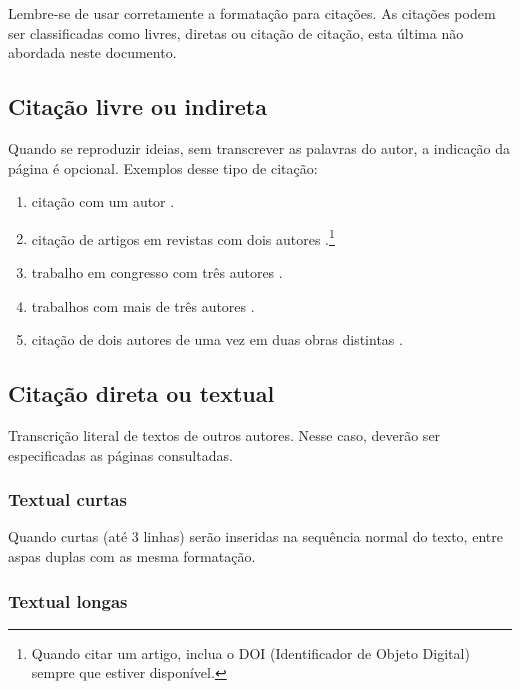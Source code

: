 Lembre-se de usar corretamente a formatação para citações. As citações podem ser classificadas como livres, diretas ou citação de citação, esta última não abordada neste documento.


\estrutura\subsection{\esp Citação livre ou indireta}\instrucao

Quando se reproduzir ideias, sem transcrever as palavras do autor, a indicação da página é opcional. Exemplos desse tipo de citação:
\begin{enumerate} 
 \item citação com um autor \cite{knuth1968}. 
 \item citação de artigos em revistas com dois autores \cite{prenner2022}.\footnote{Quando citar um artigo, inclua o DOI (Identificador de Objeto Digital) sempre que estiver disponível.}
  \item trabalho em congresso com três autores \cite{vasconcelos2016}.
 \item trabalhos com mais de três autores \cite{cap-livro2005}.
 \item citação de dois autores de uma vez em duas obras distintas \cite{gil2022,groupp2003}.
\end{enumerate}

\estrutura\subsection{\esp Citação direta ou textual}\instrucao

Transcrição literal de textos de outros autores. Nesse caso, deverão ser especificadas as páginas consultadas. 


\estrutura\subsubsection{\esp Textual curtas}\instrucao

Quando curtas (até 3 linhas) serão inseridas na sequência normal do texto, entre aspas duplas com as mesma formatação.

\estrutura\subsubsection{\esp Textual longas}\instrucao

